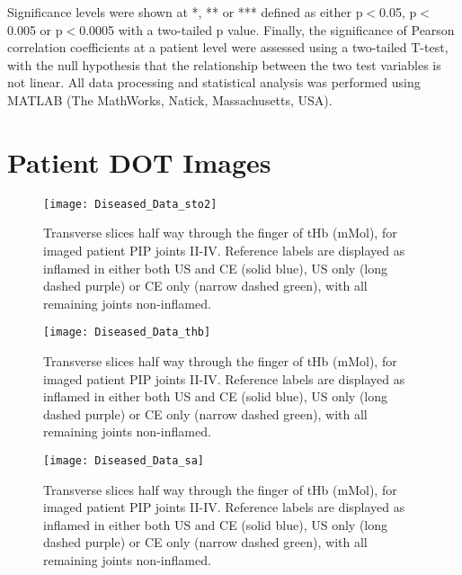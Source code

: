 \documentclass[twoside]{bhamthesis}
\theoremstyle{definition}
\begin{document}
Significance levels were shown at *, ** or *** defined as either p$<$0.05, p$<$0.005 or  p$<$0.0005 with a two-tailed p value. Finally, the significance of Pearson correlation coefficients at a patient level were assessed using a two-tailed T-test, with the null hypothesis that the relationship between the two test variables is not linear. All data processing and statistical analysis was performed using MATLAB (The MathWorks, Natick, Massachusetts, USA).



\section{Patient DOT Images}

\begin{figure}[!ht]
\centering\texttt{[image: Diseased\_Data\_sto2]}
\caption{Transverse slices half way through the finger of tHb (mMol), for imaged patient PIP joints II-IV. Reference labels are displayed as inflamed in either both US and CE (solid blue), US only (long dashed purple) or CE only (narrow dashed green), with all remaining joints non-inflamed.}
\label{fig:Diseased_Data_sto2}
\end{figure}

\begin{figure}[!ht]
\centering\texttt{[image: Diseased\_Data\_thb]}
\caption{Transverse slices half way through the finger of tHb (mMol), for imaged patient PIP joints II-IV. Reference labels are displayed as inflamed in either both US and CE (solid blue), US only (long dashed purple) or CE only (narrow dashed green), with all remaining joints non-inflamed.}
\label{fig:Diseased_Data_thb}
\end{figure}

\begin{figure}[!ht]
\centering\texttt{[image: Diseased\_Data\_sa]}
\caption{Transverse slices half way through the finger of tHb (mMol), for imaged patient PIP joints II-IV. Reference labels are displayed as inflamed in either both US and CE (solid blue), US only (long dashed purple) or CE only (narrow dashed green), with all remaining joints non-inflamed.}
\label{fig:Diseased_Data_sa}
\end{figure}
\end{document}
